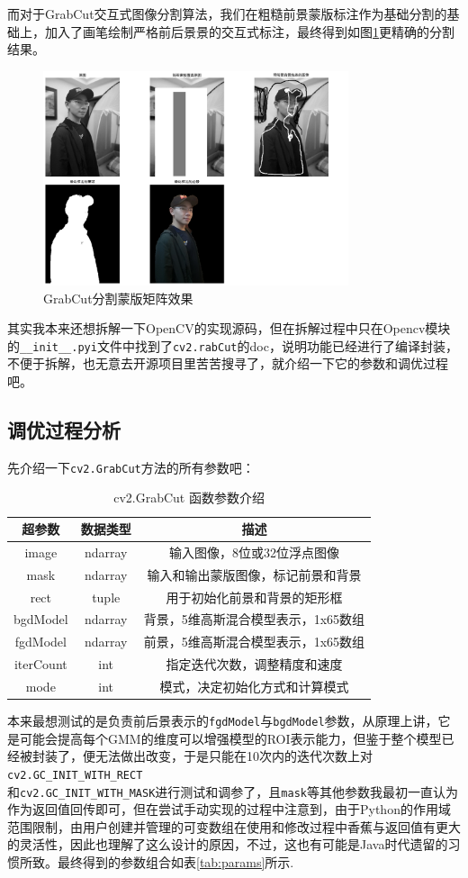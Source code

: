 \documentclass[UTF8]{ctexart}
\begin{document}
而对于GrabCut交互式图像分割算法，我们在粗糙前景蒙版标注作为基础分割的基础上，加入了画笔绘制严格前后景景的交互式标注，最终得到如图\ref{fig:GrabCut}更精确的分割结果。
\begin{figure}[H]
  \centering
  \includegraphics[width=0.8\textwidth]{./images/GrabCut.png}
  \caption{GrabCut分割蒙版矩阵效果}
  \label{fig:GrabCut}
  \end{figure}
其实我本来还想拆解一下OpenCV的实现源码，但在拆解过程中只在Opencv模块的\verb|__init__.pyi|文件中找到了\verb|cv2.rabCut|的doc，说明功能已经进行了编译封装，不便于拆解，也无意去开源项目里苦苦搜寻了，就介绍一下它的参数和调优过程吧。
\subsection{调优过程分析}
先介绍一下\verb|cv2.GrabCut|方法的所有参数吧：\par
\begin{table}[htbp]
\centering
\begin{tabular}{ccc}
\toprule[1.5pt]
\textbf{超参数} & \textbf{数据类型} & \textbf{描述} \\
\midrule
image & ndarray & 输入图像，8位或32位浮点图像 \\
mask & ndarray & 输入和输出蒙版图像，标记前景和背景 \\
rect & tuple & 用于初始化前景和背景的矩形框 \\
bgdModel & ndarray & 背景，5维高斯混合模型表示，1x65数组 \\
fgdModel & ndarray & 前景，5维高斯混合模型表示，1x65数组 \\
iterCount & int & 指定迭代次数，调整精度和速度 \\
mode & int & 模式，决定初始化方式和计算模式 \\
\bottomrule[1.5pt]
\end{tabular}
\caption{cv2.GrabCut 函数参数介绍}
\end{table}
本来最想测试的是负责前后景表示的\verb|fgdModel|与\verb|bgdModel|参数，从原理上讲，它是可能会提高每个GMM的维度可以增强模型的ROI表示能力，但鉴于整个模型已经被封装了，便无法做出改变，于是只能在10次内的迭代次数上对\verb|cv2.GC_INIT_WITH_RECT|\\和\verb|cv2.GC_INIT_WITH_MASK|进行测试和调参了，且\verb|mask|等其他参数我最初一直认为作为返回值回传即可，但在尝试手动实现的过程中注意到，由于Python的作用域范围限制，由用户创建并管理的可变数组在使用和修改过程中香蕉与返回值有更大的灵活性，因此也理解了这么设计的原因，不过，这也有可能是Java时代遗留的习惯所致。最终得到的参数组合如表\ref{tab:params}所示.
\end{document}

